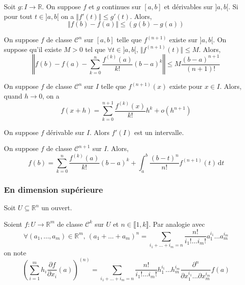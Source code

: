 	\begin{theorem}
		Soit $g : I \rightarrow \mathbb{R}$. On suppose $f$ et $g$ continues sur $[a,b]$ et dérivables sur $]a,b[$. Si pour tout $t \in ]a,b[$ on a $\Vert f'(t) \Vert \leq g'(t)$. Alors,
		\[ \Vert f(b) - f(a) \Vert \leq (g(b) - g(a)) \]
	\end{theorem}

	\begin{corollary}
		On suppose $f$ de classe $\mathcal{C}^n$ sur $[a,b]$ telle que $f^{(n+1)}$ existe sur $]a,b[$. On suppose qu'il existe $M > 0$ tel que $\forall t \in ]a,b[, \, \Vert f^{(n+1)}(t) \Vert \leq M$. Alors,
		\[ \left\Vert f(b) - f(a) - \sum_{k=0}^{n} \frac{f^{(k)}(a)}{k!}(b-a)^k \right\Vert \leq M \frac{(b-a)^{n+1}}{(n+1)!} \]
	\end{corollary}

	\begin{theorem}
		\label{218-2}
		On suppose $f$ de classe $\mathcal{C}^n$ sur $I$ telle que $f^{(n+1)}(x)$ existe pour $x \in I$. Alors, quand $h \longrightarrow 0$, on a
		\[ f(x+h) = \sum_{k=0}^{n+1} \frac{f^{(k)} (x)}{k!} h^k + o(h^{n+1}) \]
	\end{theorem}


	\begin{application}
		On suppose $f$ dérivable sur $I$. Alors $f'(I)$ est un intervalle.
	\end{application}


	\begin{theorem}
		On suppose $f$ de classe $\mathcal{C}^{n+1}$ sur $I$. Alors,
		\[ f(b) = \sum_{k=0}^{n} \frac{f^{(k)} (a)}{k!} (b-a)^k + \int_a^b \frac{(b-t)^n}{n!} f^{(n+1)}(t) \, \mathrm{d}t \]
	\end{theorem}

	\subsubsection{En dimension supérieure}


	Soit $U \subseteq \mathbb{R}^n$ un ouvert.

	\begin{notation}
		Soient $f : U \rightarrow \mathbb{R}^m$ de classe $\mathcal{C}^k$ sur $U$ et $n \in \llbracket 1, k \rrbracket$. Par analogie avec
		\[ \forall (a_1, \dots, a_m) \in \mathbb{R}^m, \, (a_1 + \dots + a_m)^n = \sum_{i_1+\dots+i_m=n} \frac{n!}{i_1! \dots i_m!} a_1^{i_1} \dots a_m^{i_m} \]
		on note
		\[ \left( \sum_{i=1}^m h_i \frac{\partial f}{\partial x_i} (a) \right)^{(n)} = \sum_{i_1+\dots+i_m=n} \frac{n!}{i_1! \dots i_m!} h_1^{i_1} \dots h_m^{i_m} \frac{\partial^n}{\partial x_1^{i_1} \dots \partial x_m^{i_m}} f(a) \]
	\end{notation}

